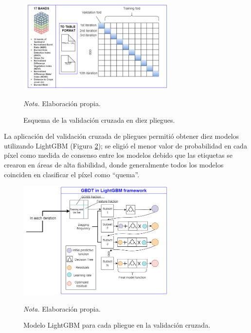 \begin{figure}[H]
    \centering
    \caption{Esquema de la validación cruzada en diez pliegues.}
    \includegraphics[width=0.7\textwidth]{img/6_metodologia/crossval.png}  
    \label{fig:crossval}
    \begin{flushleft}
        \vspace{-\baselineskip}
        \textit{Nota.} Elaboración propia.        
        \vspace{-\baselineskip}
    \end{flushleft}
\end{figure}

La aplicación del validación cruzada de pliegues permitió obtener diez modelos utilizando LightGBM (Figura \ref{fig:lightgbm}); se eligió el menor valor de probabilidad en cada píxel como medida de consenso entre los modelos
debido que las etiquetas se crearon en áreas de alta fiabilidad, donde generalmente todos los modelos coinciden en clasificar el píxel como ``quema''. 
 \begin{figure}[H]
    \centering
    \caption{Modelo LightGBM para cada pliegue en la validación cruzada.}
    \includegraphics[width=0.7\textwidth]{img/6_metodologia/gbdt.png}  
    \label{fig:lightgbm}
    \begin{flushleft}
        \vspace{-\baselineskip}
        \textit{Nota.} Elaboración propia.        
        \vspace{-\baselineskip}
    \end{flushleft}
 \end{figure}

